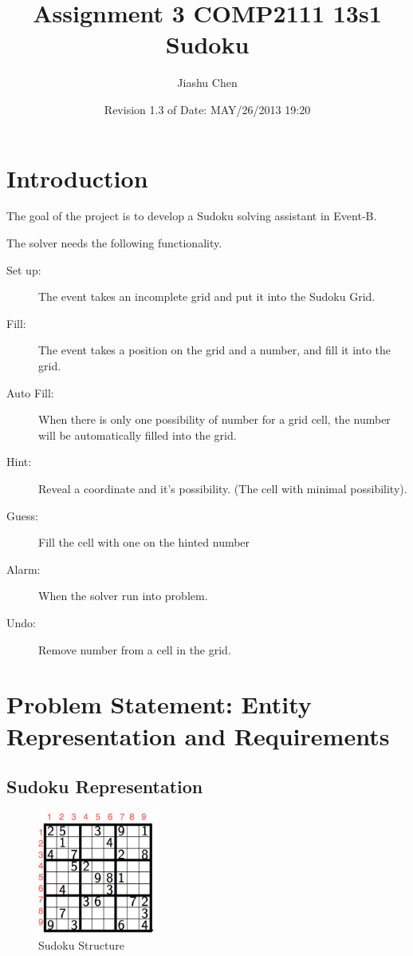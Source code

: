 \documentclass[a4paper]{article}
\title{\textbf{Assignment 3 COMP2111 13s1\\Sudoku}}
\author{Jiashu Chen\\
}
\date{Revision 1.3 of Date: MAY/26/2013 19:20}
\begin{document}
\thispagestyle{empty}
\maketitle
\tableofcontents
\newpage
\setcounter{page}{1}

\section{Introduction}

\indent\indent The goal of the project is to develop a Sudoku solving assistant in Event-B.

The solver needs the following functionality.

\begin{description}
\item [Set up:] The event takes an incomplete grid and put it into the Sudoku Grid.
\item [Fill:] The event takes a position on the grid and a number, and fill it into the grid.
\item [Auto Fill:] When there is only one possibility of number for a grid cell, the number will be automatically filled into the grid.
\item [Hint:] Reveal a coordinate and it's possibility. (The cell with minimal possibility).
\item [Guess:] Fill the cell with one on the hinted number
\item [Alarm:] When the solver run into problem.
\item [Undo:] Remove number from a cell in the grid.
\end{description}

\vspace{1.5 cm}

\section{Problem Statement: Entity Representation and Requirements}

\subsection{Sudoku Representation}

\begin{figure}[h!]
  \begin{center}
  \includegraphics[width=0.35\textwidth]{SudokuSet.png}
  \caption{Sudoku Structure}
  \end{center}
\end{figure}
\end{document}
